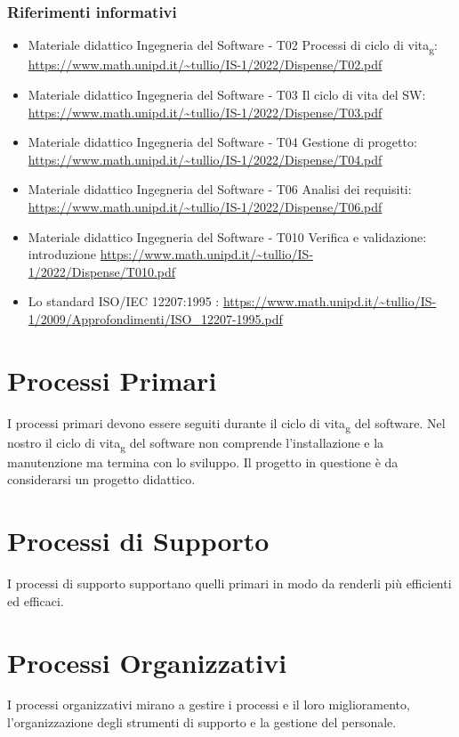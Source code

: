 \documentclass[a4paper]{article}
\begin{document}
\subsubsection{Riferimenti informativi}
\begin{itemize}
	\item Materiale didattico Ingegneria del Software - T02 Processi di ciclo di vita\textsubscript{g}: \url{https://www.math.unipd.it/~tullio/IS-1/2022/Dispense/T02.pdf}
	\item Materiale didattico Ingegneria del Software - T03 Il ciclo di vita del SW: \url{https://www.math.unipd.it/~tullio/IS-1/2022/Dispense/T03.pdf}
	\item Materiale didattico Ingegneria del Software - T04 Gestione di progetto: \url{https://www.math.unipd.it/~tullio/IS-1/2022/Dispense/T04.pdf}
	\item Materiale didattico Ingegneria del Software - T06 Analisi dei requisiti: \url{https://www.math.unipd.it/~tullio/IS-1/2022/Dispense/T06.pdf}
	\item Materiale didattico Ingegneria del Software - T010 Verifica e validazione: introduzione \url{https://www.math.unipd.it/~tullio/IS-1/2022/Dispense/T010.pdf}
	\item Lo standard ISO/IEC 12207:1995 : \url{https://www.math.unipd.it/~tullio/IS-1/2009/Approfondimenti/ISO_12207-1995.pdf}
\end{itemize}
\pagebreak

\section{Processi Primari}
I processi primari devono essere seguiti durante il ciclo di vita\textsubscript{g} del software.
Nel nostro il ciclo di vita\textsubscript{g} del software non comprende l'installazione e la manutenzione ma termina con lo sviluppo.
Il progetto in questione è da considerarsi un progetto didattico.

\pagebreak
\section{Processi di Supporto}
I processi di supporto supportano quelli primari in modo da renderli più efficienti ed efficaci.

\pagebreak
\section{Processi Organizzativi}
I processi organizzativi mirano a gestire i processi e il loro miglioramento, l'organizzazione degli strumenti 
di supporto e la gestione del personale.

\pagebreak

\pagebreak

\pagebreak

\pagebreak
\end{document}
